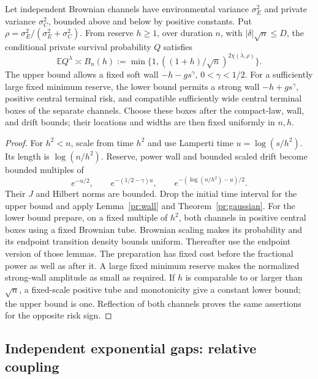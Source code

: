 \begin{corollary}\label{pr:brownian}
Let independent Brownian channels have environmental variance $\sigma_E^2$
and private variance $\sigma_C^2$, bounded above and below by positive
constants. Put $\rho=\sigma_E^2/(\sigma_E^2+\sigma_C^2)$. From reserve
$h\ge1$, over duration $n$, with $|\delta|\sqrt n\le D$, the conditional
private survival probability $Q$ satisfies
\begin{equation}
 \mathbb E Q^\lambda\asymp
 B_n(h):=\min\{1,((1+h)/\sqrt n)^{2\chi(\lambda,\rho)}\}.
 \label{pr:Bn}
\end{equation}
The upper bound allows a fixed soft wall $-h-gs^\gamma$, $0<\gamma<1/2$.
For a sufficiently large fixed minimum reserve, the lower bound permits
a strong wall $-h+gs^\gamma$, positive central terminal risk, and
compatible sufficiently wide central terminal boxes of the separate
channels. Choose these boxes after the compact-law, wall, and drift
bounds; their locations and widths are then fixed uniformly in $n,h$.
\end{corollary}
\begin{proof}
For $h^2<n$, scale from time $h^2$ and use Lamperti time $u=\log(s/h^2)$.
Its length is $\log(n/h^2)$. Reserve, power wall and bounded scaled drift
become bounded multiples of
\[
 e^{-u/2},\qquad e^{-(1/2-\gamma)u},\qquad
 e^{-(\log(n/h^2)-u)/2}.
\]
Their $J$ and Hilbert norms are bounded. Drop the initial time interval
for the upper bound and apply Lemma~\ref{pr:wall} and
Theorem~\ref{pr:gaussian}. For the lower bound prepare, on a fixed multiple
of $h^2$, both channels in positive central boxes using a fixed Brownian
tube. Brownian scaling makes its probability and its endpoint transition
density bounds uniform. Thereafter use the endpoint version of those
lemmas. The preparation has fixed cost before the fractional power as
well as after it. A large fixed minimum reserve makes the normalized
strong-wall amplitude as small as required. If $h$ is comparable to or
larger than $\sqrt n$, a fixed-scale positive tube and monotonicity give
a constant lower bound; the upper bound is one. Reflection of both
channels proves the same assertions for the opposite risk sign.
\end{proof}

\subsection{Independent exponential gaps: relative coupling}

